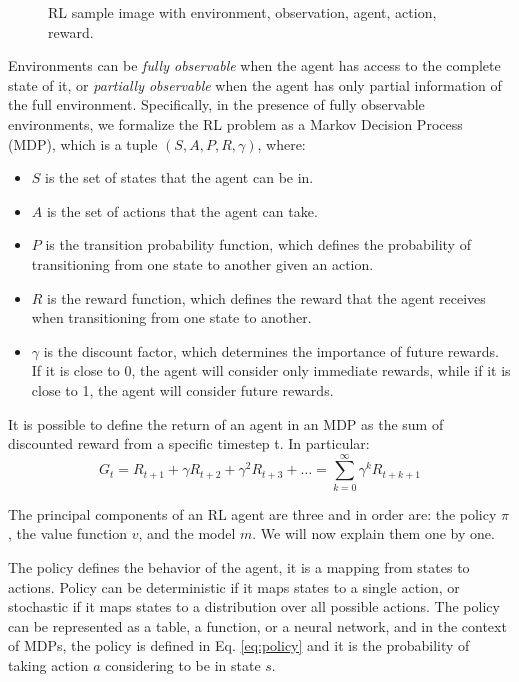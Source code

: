 \begin{figure}[ht]
    \begin{center}
        \fbox{\rule[-.5cm]{0cm}{4cm} \rule[-.5cm]{4cm}{0cm}}
    \end{center}
    \caption{RL sample image with environment, observation, agent, action, reward.}
    \label{fig:rl}
\end{figure}


Environments can be \textit{fully observable} when the agent has access to the complete state of it, or \textit{partially observable} when the agent has only partial information of the full environment.
Specifically, in the presence of fully observable environments, we formalize the RL problem as a Markov Decision Process (MDP), which is a tuple $(S, A, P, R, \gamma)$, where:
\begin{itemize}
    \item $S$ is the set of states that the agent can be in.
    \item $A$ is the set of actions that the agent can take.
    \item $P$ is the transition probability function, which defines the probability of transitioning from one state to another given an action.
    \item $R$ is the reward function, which defines the reward that the agent receives when transitioning from one state to another.
    \item $\gamma$ is the discount factor, which determines the importance of future rewards.
    If it is close to 0, the agent will consider only immediate rewards, while if it is close to 1, the agent will consider future rewards.
\end{itemize}

It is possible to define the return of an agent in an MDP as the sum of discounted reward from a specific timestep t.
In particular:
\begin{equation} \label{eq:return}
    G_t = R_{t+1} + \gamma R_{t+2} + \gamma^2 R_{t+3} + \dots = \sum_{k=0}^{\infty} \gamma^k R_{t+k+1}
\end{equation}

The principal components of an RL agent are three and in order are: the policy $\pi$, the value function $v$, and the model $m$.
We will now explain them one by one.

The policy defines the behavior of the agent, it is a mapping from states to actions.
Policy can be deterministic if it maps states to a single action, or stochastic if it maps states to a distribution over all possible actions.
The policy can be represented as a table, a function, or a neural network, and in the context of MDPs, the policy is defined in Eq. \ref{eq:policy} and it is the probability of taking action $a$ considering to be in state $s$.

